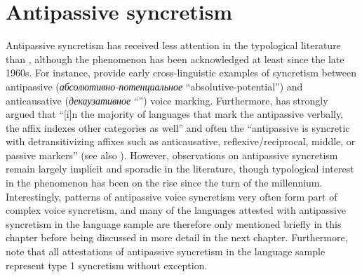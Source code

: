\section{Antipassive syncretism} \label{sec:simple-syncretism:antipassive}
Antipassive syncretism has received less attention in the typological literature than , although the phenomenon has been acknowledged at least since the late 1960s. For instance, \citet[40ff.]{nedjalkov:silnickij:1969} provide early cross-linguistic examples of syncretism between antipassive (\textit{абсолютивно-потенциальное} “absolutive-potential”) and anticausative (\textit{декаузативное} “”) voice marking. Furthermore, \citet[314]{polinsky:2017} has strongly argued that “[i]n the majority of languages that mark the antipassive verbally, the affix indexes other categories as well” and often the “antipassive is syncretic with detransitivizing affixes such as anticausative, reflexive/reciprocal, middle, or passive markers” (see also \citealt[139]{heaton:2020}). However, observations on antipassive syncretism remain largely implicit and sporadic in the literature, though typological interest in the phenomenon has been on the rise since the turn of the millennium. Interestingly, patterns of antipassive voice syncretism very often form part of complex voice syncretism, and many of the languages attested with antipassive syncretism in the language sample are therefore only mentioned briefly in this chapter before being discussed in more detail in the next chapter. Furthermore, note that all attestations of antipassive syncretism in the language sample represent type 1 syncretism without exception.


